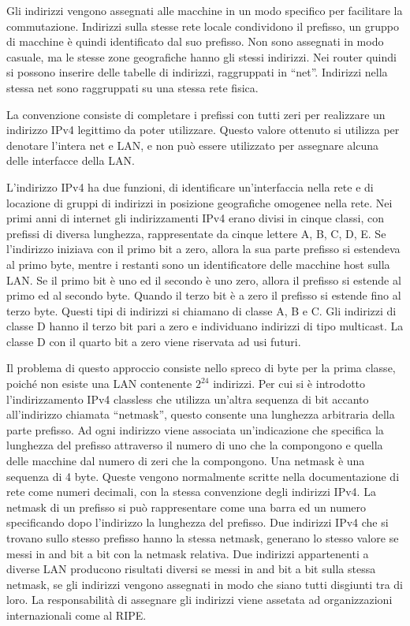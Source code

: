 \documentclass{article}
\numberwithin{equation}{subsection}
\begin{document}
Gli indirizzi vengono assegnati alle macchine in un modo specifico per facilitare la commutazione. Indirizzi sulla stesse rete locale condividono il prefisso, un gruppo 
di macchine è quindi identificato dal suo prefisso. Non sono assegnati in modo casuale, ma le stesse zone geografiche hanno gli stessi indirizzi. Nei router quindi si 
possono inserire delle tabelle di indirizzi, raggruppati in ``net''. Indirizzi nella stessa net sono raggruppati su una stessa rete fisica. 

La convenzione consiste di completare i prefissi con tutti zeri per realizzare un indirizzo IPv4 legittimo da poter utilizzare. Questo valore ottenuto si utilizza per 
denotare l'intera net e LAN, e non può essere utilizzato per assegnare alcuna delle interfacce della LAN. 

L'indirizzo IPv4 ha due funzioni, di identificare un'interfaccia nella rete e di locazione di gruppi di indirizzi in posizione geografiche omogenee nella rete. 
Nei primi anni di internet gli indirizzamenti IPv4 erano divisi in cinque classi, con prefissi di diversa lunghezza, rappresentate da cinque lettere A, B, C, D, E. 
Se l'indirizzo iniziava con il primo bit a zero, allora la sua parte prefisso si estendeva al primo byte, mentre i restanti sono un identificatore delle macchine host sulla 
LAN. Se il primo bit è uno ed il secondo è uno zero, allora il prefisso si estende al primo ed al secondo byte. Quando il terzo bit è a zero il prefisso si 
estende fino al terzo byte. Questi tipi di indirizzi si chiamano di classe A, B e C. Gli indirizzi di classe D hanno il terzo bit pari a zero e individuano 
indirizzi di tipo multicast. La classe D con il quarto bit a zero viene riservata ad usi futuri. 


Il problema di questo approccio consiste nello spreco di byte per la prima classe, poiché non esiste una LAN contenente $2^{24}$ indirizzi. Per cui si è introdotto 
l'indirizzamento IPv4 classless che utilizza un'altra sequenza di bit accanto all'indirizzo chiamata ``netmask'', questo consente una lunghezza arbitraria della parte 
prefisso. Ad ogni indirizzo viene associata un'indicazione che specifica la lunghezza del prefisso attraverso il numero di uno che la compongono e quella delle macchine 
dal numero di zeri che la compongono. Una netmask è una sequenza di 4 byte. Queste vengono normalmente scritte nella documentazione di rete come numeri decimali, 
con la stessa convenzione degli indirizzi IPv4. 
La netmask di un prefisso si può rappresentare come una barra ed un numero specificando dopo l'indirizzo la lunghezza del prefisso. 
Due indirizzi IPv4 che si trovano sullo stesso prefisso hanno la stessa netmask, generano lo stesso valore se messi in and bit a bit con la netmask 
relativa. 
Due indirizzi appartenenti a diverse LAN producono risultati diversi se messi in and bit a bit sulla stessa netmask, se gli indirizzi vengono 
assegnati in modo che siano tutti disgiunti tra di loro. La responsabilità di assegnare gli indirizzi viene assetata ad organizzazioni internazionali come al RIPE. 
\end{document}
